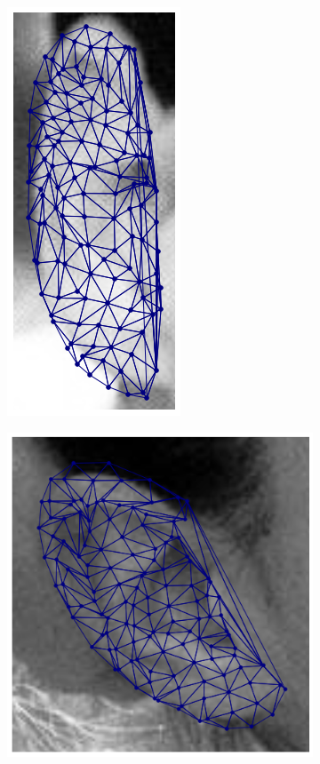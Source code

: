 \begin{figure}[!h]
\begin{subfigure}[b]{0.7\textwidth}
    \end{subfigure}
    \begin{subfigure}[b]{0.7\textwidth}
            \includegraphics[height=1\textwidth]{supports/Fittings/fitting_ear_0016}
    \end{subfigure}
    \begin{subfigure}[b]{0.7\textwidth}
            \includegraphics[height=1\textwidth]{supports/Fittings/fitting_ear_0028}

\end{subfigure}
\end{figure}
